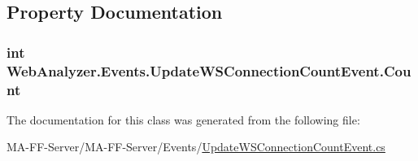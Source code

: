 \subsection{Property Documentation}
\hypertarget{class_web_analyzer_1_1_events_1_1_update_w_s_connection_count_event_acb56db24868f14519a9bb0781413a337}{}
\subsubsection[{Count}]{\setlength{\rightskip}{0pt plus 5cm}int Web\+Analyzer.\+Events.\+Update\+W\+S\+Connection\+Count\+Event.\+Count\hspace{0.3cm}{\ttfamily [get]}}\label{class_web_analyzer_1_1_events_1_1_update_w_s_connection_count_event_acb56db24868f14519a9bb0781413a337}


The documentation for this class was generated from the following file\+:\begin{DoxyCompactItemize}
\item 
M\+A-\/\+F\+F-\/\+Server/\+M\+A-\/\+F\+F-\/\+Server/\+Events/\hyperlink{_update_w_s_connection_count_event_8cs}{Update\+W\+S\+Connection\+Count\+Event.\+cs}\end{DoxyCompactItemize}
